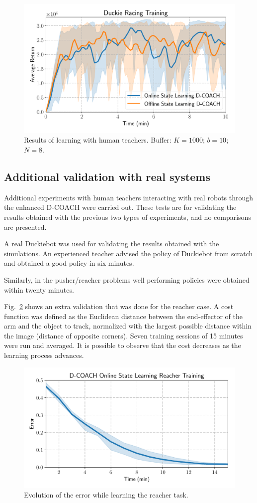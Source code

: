\begin{figure}[t]
    \centering
    \includegraphics[width=0.9\linewidth]{imagenes/cap3/duckie_human_teacher_ICRA.pdf}
    \caption{Results of learning with human teachers. Buffer: $K = 1000$; $b = 10$; $N = 8$.}
    \label{fig:humanteachers2}
\end{figure}

\subsection{Additional validation with real systems}

Additional experiments with human teachers interacting with real robots through the enhanced D-COACH were carried out. These tests are for validating the results obtained with the previous two types of experiments, and no comparisons are presented.

A real Duckiebot was used for validating the results obtained with the simulations. An experienced teacher advised the policy of Duckiebot from scratch and obtained a good policy in six minutes.

Similarly, in the pusher/reacher problems well performing policies were obtained within twenty minutes. 

Fig.~\ref{fig:reacher_exp} shows an extra validation that was done for the reacher case. A cost function was defined as the Euclidean distance between the end-effector of the arm and the object to track, normalized with the largest possible distance within the image (distance of opposite corners). Seven training sessions of 15 minutes were run and averaged. It is possible to observe that the cost decreases as the learning process advances. 

\begin{figure}[h]
    \centering
    \includegraphics[width=0.9\linewidth]{imagenes/cap3/reacher_ICRA.pdf}
    \caption{Evolution of the error while learning the reacher task. }
    \label{fig:reacher_exp}
\end{figure}
